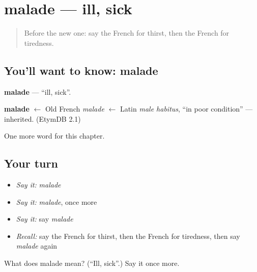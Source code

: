 \section[malade]{malade — ill, sick}

\label{lesson:FR-C54-malade}



\begin{quote}
Before the new one: say the French for thirst, then the French for tiredness.
\end{quote}

\subsection*{You'll want to know: malade}
\textbf{malade} — \textquotedblleft{}ill, sick\textquotedblright{}.

\begin{cousinweb}
\textbf{malade} $\leftarrow$ Old French \emph{malade} $\leftarrow$ Latin \emph{male habitus}, \textquotedblleft{}in poor condition\textquotedblright{} — inherited. (EtymDB 2.1)
\end{cousinweb}

\begin{grammarlens}[title={What you've built}]
One more word for this chapter.
\end{grammarlens}

\subsection*{Your turn}
\begin{itemize}
\raggedright
  \item \emph{Say it:} \emph{malade}
  \item \emph{Say it:} \emph{malade}, once more
  \item \emph{Say it:} say \emph{malade}
  \item \emph{Recall:} say the French for thirst, then the French for tiredness, then say \emph{malade} again
\end{itemize}

\begin{tcolorbox}[breakable,colback=teal!4,colframe=teal!35!black,title={Before you move on}]
What does malade mean? (\textquotedblleft{}Ill, sick\textquotedblright{}.) Say it once more.
\end{tcolorbox}
